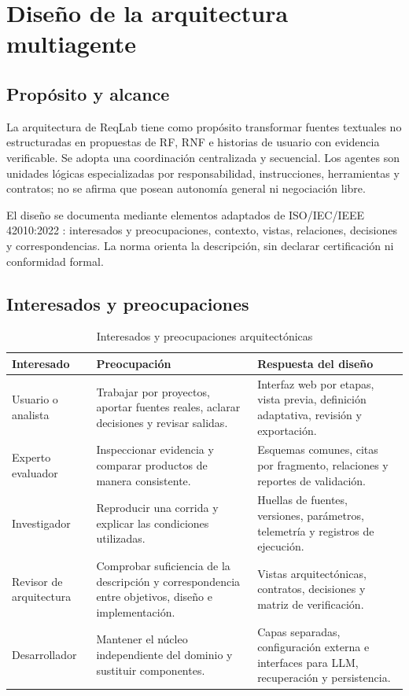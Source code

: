 \chapter{Diseño de la arquitectura multiagente}
\label{cap:arquitectura}

\section{Propósito y alcance}

La arquitectura de ReqLab tiene como propósito transformar fuentes textuales no estructuradas en propuestas de RF, RNF e historias de usuario con evidencia verificable. Se adopta una coordinación centralizada y secuencial. Los agentes son unidades lógicas especializadas por responsabilidad, instrucciones, herramientas y contratos; no se afirma que posean autonomía general ni negociación libre.

El diseño se documenta mediante elementos adaptados de ISO/IEC/IEEE 42010:2022 \cite{iso42010}: interesados y preocupaciones, contexto, vistas, relaciones, decisiones y correspondencias. La norma orienta la descripción, sin declarar certificación ni conformidad formal.

\section{Interesados y preocupaciones}

\begin{table}[H]
  \centering
  \caption{Interesados y preocupaciones arquitectónicas}
  \label{tab:interesados-arquitectura}
  \small
  \begin{tabularx}{\textwidth}{p{3.4cm}YY}
    \toprule
    Interesado & Preocupación & Respuesta del diseño \\
    \midrule
    Usuario o analista & Trabajar por proyectos, aportar fuentes reales, aclarar decisiones y revisar salidas. & Interfaz web por etapas, vista previa, definición adaptativa, revisión y exportación. \\
    Experto evaluador & Inspeccionar evidencia y comparar productos de manera consistente. & Esquemas comunes, citas por fragmento, relaciones y reportes de validación. \\
    Investigador & Reproducir una corrida y explicar las condiciones utilizadas. & Huellas de fuentes, versiones, parámetros, telemetría y registros de ejecución. \\
    Revisor de arquitectura & Comprobar suficiencia de la descripción y correspondencia entre objetivos, diseño e implementación. & Vistas arquitectónicas, contratos, decisiones y matriz de verificación. \\
    Desarrollador & Mantener el núcleo independiente del dominio y sustituir componentes. & Capas separadas, configuración externa e interfaces para LLM, recuperación y persistencia. \\
    \bottomrule
  \end{tabularx}
\end{table}

